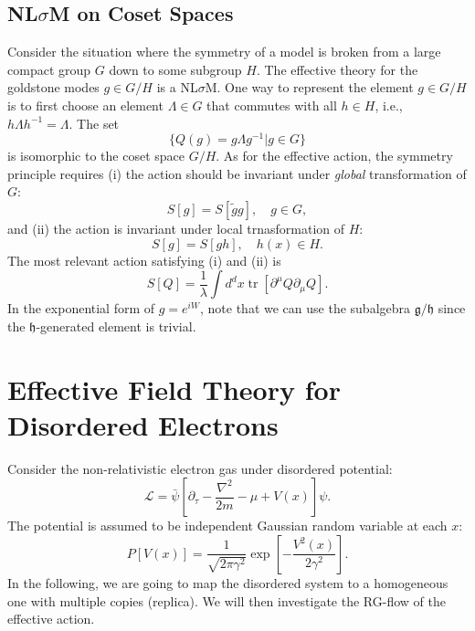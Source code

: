 \documentclass[aps,prb,superscriptaddress,nofootinbib]{revtex4}
\def \tr{\operatorname{tr}}
\begin{document}
\subsection{NL$\sigma$M on Coset Spaces}
\label{NLSM-coset}
Consider the situation where the symmetry of a model is broken from a large compact group $G$ down to some subgroup $H$.
The effective theory for the goldstone modes $g \in G/H$ is a NL$\sigma$M.
One way to represent the element $g \in G/H$ is to first choose an element $\Lambda\in G$ that commutes with all $h\in H$, i.e., $h\Lambda h^{-1}=\Lambda$.
The set
\begin{equation}
	\{Q(g) = g\Lambda g^{-1}|g\in G\}
\end{equation} 
is isomorphic to the coset space $G/H$.
As for the effective action, the symmetry principle requires (i) the action should be invariant under \textit{global} transformation of $G$: 
\begin{equation}
	S[g] = S[\tilde g g],\quad g\in G,
\end{equation}
and (ii) the action is invariant under local trnasformation of $H$:
\begin{equation}
	S[g] = S[gh], \quad h(x) \in H.
\end{equation}
The most relevant action satisfying (i) and (ii) is
\begin{equation}
	S[Q] = \frac{1}{\lambda}\int d^d x \tr[\partial^\mu Q \partial_\mu Q].
\end{equation}
In the exponential form of $g=e^{iW}$, note that we can use the subalgebra $\mathfrak{g}/\mathfrak{h}$ since the $\mathfrak h$-generated element is trivial.


\section{Effective Field Theory for Disordered Electrons}

Consider the non-relativistic electron gas under disordered potential:
\begin{equation}
	\mathcal L = \bar\psi \left[\partial_\tau -\frac{\nabla^2}{2m}-\mu+V(x) \right]\psi. 
\end{equation}
The potential is assumed to be independent Gaussian random variable at each $x$:
\begin{equation}
	P[V(x)] = \frac{1}{\sqrt{2\pi \gamma^2}}\exp\left[-\frac{V^2(x)}{2\gamma^2}\right].
\end{equation}
In the following, we are going to map the disordered system to a homogeneous one with multiple copies (replica).
We will then investigate the RG-flow of the effective action.
\end{document}
